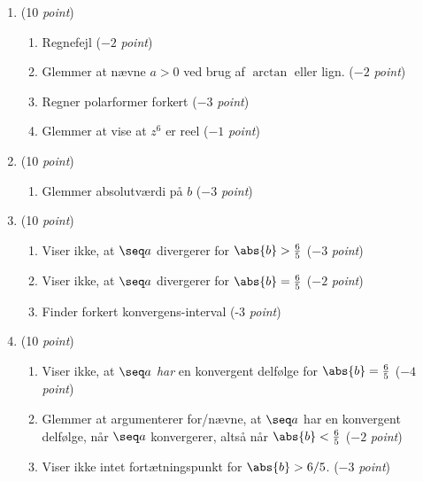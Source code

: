 \documentclass{article}
\begin{document}
\begin{opg}\hfill
	\begin{enumerate}
		\item (10 \emph{point})\begin{enumerate}[label=(\roman*)]
			\item Regnefejl ($ -2 $ \textit{point})
			\item Glemmer at nævne $ a>0 $ ved brug af $ \arctan $ eller lign. ($ -2 $\textit{ point})
			\item Regner polarformer forkert ($ -3 $ \emph{point})
			\item Glemmer at vise at $ z^6 $ er reel ($ -1 $ \emph{point})
		\end{enumerate}
		\item (10 \emph{point}) \begin{enumerate}[label=(\roman*)]
			\item Glemmer absolutværdi på $ b $ ($ -3 $ \emph{point})
		\end{enumerate}
		\item (10 \emph{point})\begin{enumerate}[label=(\roman*)]
			\item Viser ikke, at $ \seq
			 a $ divergerer for $ \abs{b}>\frac{6}{5} $ ($ -3 $ \emph{point})
			\item Viser ikke, at $ \seq a $ divergerer for $ \abs{b}=\frac{6}{5} $ ($ -2 $ \emph{point})
			\item Finder forkert konvergens-interval (-3 \emph{point})
		\end{enumerate}
		\item (10 \emph{point})\begin{enumerate}[label=(\roman*)]
			\item Viser ikke, at $ \seq a $ \emph{har} en konvergent delfølge for $ \abs{b}=\frac{6}{5} $ ($ -4 $ \emph{point})
			\item Glemmer at argumenterer for/nævne, at $ \seq a $ har en konvergent delfølge, når $ \seq a $ konvergerer, altså når $ \abs{b}<\frac{6}{5} $ ($ -2 $ \emph{point})
			\item Viser ikke intet fortætningspunkt for $ \abs{b}>6/5 $. ($ -3 $ \emph{point})
		\end{enumerate}
	\end{enumerate}	
\end{opg}
\end{document}
